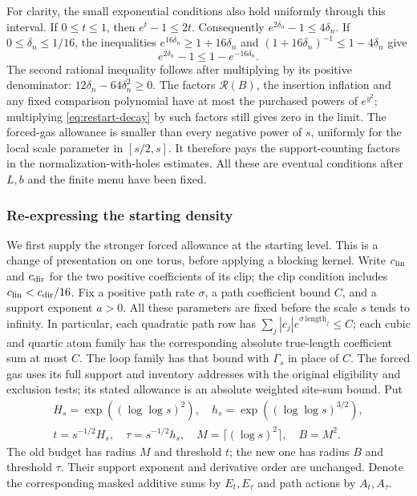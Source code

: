 For clarity, the small exponential conditions also hold uniformly
through this interval. If $0\le t\le1$, then $e^t-1\le2t$.
Consequently $e^{2\delta_n}-1\le4\delta_n$. If
$0\le\delta_n\le1/16$, the inequalities
$e^{16\delta_n}\ge1+16\delta_n$ and
$(1+16\delta_n)^{-1}\le1-4\delta_n$ give
\[
 e^{2\delta_n}-1\le1-e^{-16\delta_n}.
\]
The second rational inequality follows after multiplying by its positive
denominator: $12\delta_n-64\delta_n^2\ge0$.
The factors $\mathcal R(B)$, the insertion inflation and any fixed
comparison polynomial have at most the purchased powers of
$e^{y^2}$; multiplying \eqref{eq:restart-decay} by such factors still
gives zero in the limit. The forced-gas allowance is smaller than every
negative power of $s$, uniformly for the local scale parameter in
$[s/2,s]$. It therefore pays the support-counting factors in the
normalization-with-holes estimates. All these are eventual conditions
after $L,b$ and the finite menu have been fixed.

\subsubsection{Re-expressing the starting density}
\label{subsec:restart-endpoint-construction}

We first supply the stronger forced allowance at the starting level.
This is a change of presentation on one torus, before applying a
blocking kernel. Write $c_{\rm lin}$ and $c_{\rm dir}$ for the two
positive coefficients of its clip; the clip condition includes
$c_{\rm lin}<c_{\rm dir}/16$. Fix a positive path rate $\sigma$, a
path coefficient bound $C$, and a support exponent $a>0$. All these
parameters are fixed before the scale $s$ tends to infinity. In particular,
each quadratic path row has
$\sum_j|c_j|e^{\sigma\,\mathrm{length}_j}\le C$; each cubic and
quartic atom family has the corresponding absolute true-length
coefficient sum at most $C$. The loop family has that bound with
$\Gamma_s$ in place of $C$. The forced gas uses its full support and
inventory addresses with the original eligibility and exclusion tests;
its stated allowance is an absolute weighted site-sum bound.
Put
\[
 \begin{gathered}
 H_s=\exp((\log\log s)^2),\quad
 h_s=\exp((\log\log s)^{3/2}),\\
 t=s^{-1/2}H_s,\quad \tau=s^{-1/2}h_s,
 \quad M=\lceil(\log s)^2\rceil,\quad B=M^2.
 \end{gathered}
\]
The old budget has radius $M$ and threshold $t$; the new one has
radius $B$ and threshold $\tau$. Their support exponent and derivative
order are unchanged. Denote the corresponding masked additive sums by
$E_t,E_\tau$ and path actions by $A_t,A_\tau$.

